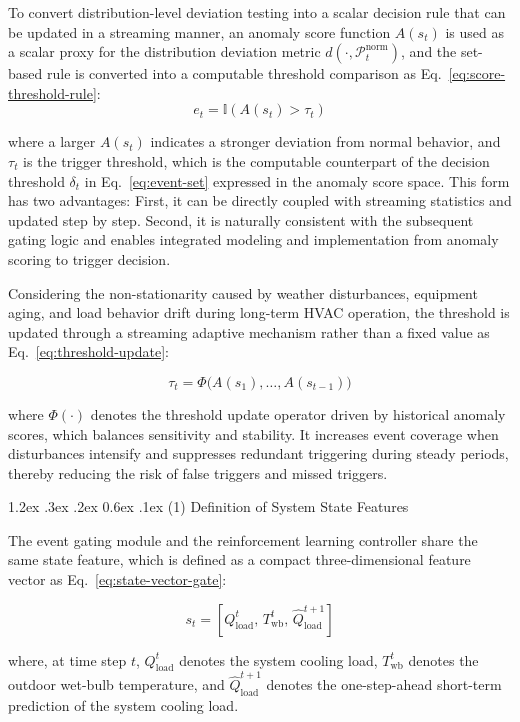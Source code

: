 \documentclass[preprint,12pt]{elsarticle}
\makeatletter
\renewcommand\paragraph{\@startsection{paragraph}{4}{\z@}%
  {1.2ex \@plus .3ex \@minus .2ex}%
  {0.6ex \@plus .1ex}%
  {\normalfont\normalsize}}
\makeatother
\begin{document}
To convert distribution-level deviation testing into a scalar decision rule that can be updated in a streaming manner, an anomaly score function \(A(s_t)\) is used as a scalar proxy for the distribution deviation metric \(d(\cdot,\mathcal{P}^{\text{norm}}_t)\), and the set-based rule is converted into a computable threshold comparison as Eq.~\eqref{eq:score-threshold-rule}: \[
e_t=\mathbb{I}(A(s_t)>\tau_t) \tag{2}\label{eq:score-threshold-rule}
\]

\noindent where a larger \(A(s_t)\) indicates a stronger deviation from normal behavior, and \(\tau_t\) is the trigger threshold, which is the computable counterpart of the decision threshold \(\delta_t\) in Eq.~\eqref{eq:event-set} expressed in the anomaly score space. This form has two advantages: First, it can be directly coupled with streaming statistics and updated step by step. Second, it is naturally consistent with the subsequent gating logic and enables integrated modeling and implementation from anomaly scoring to trigger decision.

Considering the non-stationarity caused by weather disturbances, equipment aging, and load behavior drift during long-term HVAC operation, the threshold is updated through a streaming adaptive mechanism rather than a fixed value as Eq.~\eqref{eq:threshold-update}:

\[
    \tau_t=\Phi\big(A(s_{1}),\ldots,A(s_{t-1})\big) \tag{3}\label{eq:threshold-update}
\]

\noindent where \(\Phi(\cdot)\) denotes the threshold update operator driven by historical anomaly scores, which balances sensitivity and stability. It increases event coverage when disturbances intensify and suppresses redundant triggering during steady periods, thereby reducing the risk of false triggers and missed triggers.

\paragraph{(1) Definition of System State Features}\label{definition-of-system-state-features}

The event gating module and the reinforcement learning controller share the same state feature, which is defined as a compact three-dimensional feature vector as Eq.~\eqref{eq:state-vector-gate}:

\[s_t=[Q_{\mathrm{load}}^t,\,T_{\mathrm{wb}}^t,\,\hat{Q}_{\mathrm{load}}^{t+1}] \tag{4}\label{eq:state-vector-gate}\]

\noindent where, at time step \(t\), \(Q_{\mathrm{load}}^t\) denotes the system cooling load, \(T_{\mathrm{wb}}^t\) denotes the outdoor wet-bulb temperature, and \(\hat{Q}_{\mathrm{load}}^{t+1}\) denotes the one-step-ahead short-term prediction of the system cooling load.
\end{document}
